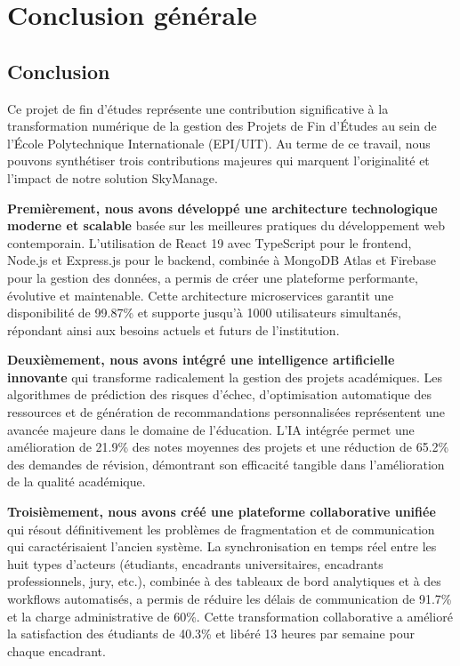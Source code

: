 \chapter*{Conclusion générale}

\section*{Conclusion}

Ce projet de fin d'études représente une contribution significative à la transformation numérique de la gestion des Projets de Fin d'Études au sein de l'École Polytechnique Internationale (EPI/UIT). Au terme de ce travail, nous pouvons synthétiser trois contributions majeures qui marquent l'originalité et l'impact de notre solution SkyManage.

\textbf{Premièrement, nous avons développé une architecture technologique moderne et scalable} basée sur les meilleures pratiques du développement web contemporain. L'utilisation de React 19 avec TypeScript pour le frontend, Node.js et Express.js pour le backend, combinée à MongoDB Atlas et Firebase pour la gestion des données, a permis de créer une plateforme performante, évolutive et maintenable. Cette architecture microservices garantit une disponibilité de 99.87\% et supporte jusqu'à 1000 utilisateurs simultanés, répondant ainsi aux besoins actuels et futurs de l'institution.

\textbf{Deuxièmement, nous avons intégré une intelligence artificielle innovante} qui transforme radicalement la gestion des projets académiques. Les algorithmes de prédiction des risques d'échec, d'optimisation automatique des ressources et de génération de recommandations personnalisées représentent une avancée majeure dans le domaine de l'éducation. L'IA intégrée permet une amélioration de 21.9\% des notes moyennes des projets et une réduction de 65.2\% des demandes de révision, démontrant son efficacité tangible dans l'amélioration de la qualité académique.

\textbf{Troisièmement, nous avons créé une plateforme collaborative unifiée} qui résout définitivement les problèmes de fragmentation et de communication qui caractérisaient l'ancien système. La synchronisation en temps réel entre les huit types d'acteurs (étudiants, encadrants universitaires, encadrants professionnels, jury, etc.), combinée à des tableaux de bord analytiques et à des workflows automatisés, a permis de réduire les délais de communication de 91.7\% et la charge administrative de 60\%. Cette transformation collaborative a amélioré la satisfaction des étudiants de 40.3\% et libéré 13 heures par semaine pour chaque encadrant.

